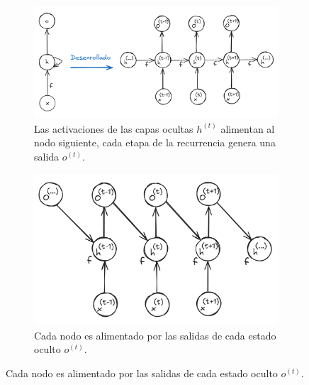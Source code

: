 \begin{figure}[!ht]
    \centering
    \begin{subfigure}[b]{0.49\textwidth}
        \centering
        \includegraphics[width=\textwidth]{Chapters/2. Transformer/Figures/rnn/rnn_cfga.png}
        \caption{Las activaciones de las capas ocultas $h^{(t)}$
        alimentan al nodo siguiente, cada etapa de la recurrencia genera una salida $o^{(t)}$.}
        \label{fig:rnn_cfga}
    \end{subfigure}
    \hfill
    \begin{subfigure}[b]{0.4\textwidth}
        \centering
        \includegraphics[width=\textwidth]{Chapters/2. Transformer/Figures/rnn/rnn_cfgb.png}
        \caption{Cada nodo es alimentado por las salidas de cada estado oculto $o^{(t)}$.}
        \label{fig:rnn_cfgb}
    \end{subfigure}


\end{figure}
